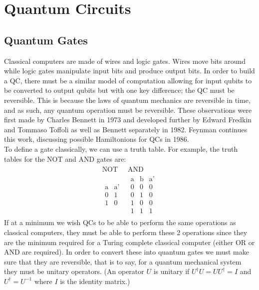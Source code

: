 \documentclass[reqno]{amsart}
\numberwithin{equation}{section}
\numberwithin{figure}{section}
\begin{document}
\section{Quantum Circuits}
\subsection{Quantum Gates}
\begin{justify}
    Classical computers are made of wires and logic gates. Wires move bits around while logic gates manipulate input bits and produce output bits. In order to build a QC, there must be a similar model of computation allowing for input qubits to be converted to output qubits but with one key difference; the QC must be reversible. This is because the laws of quantum mechanics are reversible in time, and as such, any quantum operation must be reversible. These observations were first made by Charles Bennett in 1973 \cite{Bennett1973} and developed further by Edward Fredkin and Tommaso Toffoli as well as Bennett separately in 1982. \cite{FredkinToffoli1982, Bennett1982} Feynman continues this work, discussing possible Hamiltonions for QCs in 1986. \cite{Feynman1986} \\

To define a gate classically, we can use a truth table. For example, the truth tables for the NOT and AND gates are:
    \begin{eqnarray}
        \begin{array}{c|c}
            \text{NOT} & \text{AND}\\
            \hline
            \begin{array}{c|c}
                \text{a} & \text{a'} \\
                \hline
                0 & 1 \\
                1 & 0
            \end{array} &
            \begin{array}{cc|c}
                \text{a} & \text{b} & \text{a'} \\
                \hline
                0 & 0 & 0 \\
                0 & 1 & 0 \\
                1 & 0 & 0 \\
                1 & 1 & 1
            \end{array}
        \end{array}
    \end{eqnarray}
    If at a minimum we wish QCs to be able to perform the same operations as classical computers, they must be able to perform these 2 operations since they are the minimum required for a Turing complete classical computer (either OR or AND are required). \cite{CopiCohenMcMahon2011} In order to convert these into quantum gates we must make sure that they are reversible, that is to say, for a quantum mechanical system they must be unitary operators. (An operator $U$ is unitary if $U^{\dagger}U = UU^{\dagger} = I$ and $U^{\dagger} = U^{-1}$ where $I$ is the identity matrix.) \\


\end{justify}
\end{document}
